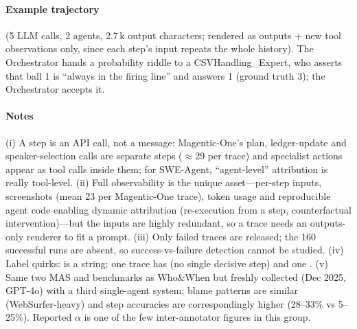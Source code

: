 \paragraph{Example trajectory}  (5 LLM calls, 2 agents, 2.7\,k output characters; rendered as outputs + new tool observations only, since each step's input repeats the whole history). The Orchestrator hands a probability riddle to a CSVHandling\_Expert, who asserts that ball 1 is ``always in the firing line'' and answers 1 (ground truth 3); the Orchestrator accepts it.


\paragraph{Notes} (i) A step is an API call, not a message: Magentic-One's plan, ledger-update and speaker-selection calls are separate steps ($\approx$29 per trace) and specialist actions appear as tool calls inside them; for SWE-Agent, ``agent-level'' attribution is really tool-level. (ii) Full observability is the unique asset---per-step inputs, screenshots (mean 23 per Magentic-One trace), token usage and reproducible agent code enabling dynamic attribution (re-execution from a step, counterfactual intervention)---but the inputs are highly redundant, so a trace needs an outputs-only renderer to fit a prompt. (iii) Only failed traces are released; the 160 successful runs are absent, so success-vs-failure detection cannot be studied. (iv) Label quirks:  is a string; one trace has  (no single decisive step) and one . (v) Same two MAS and benchmarks as Who\&When but freshly collected (Dec 2025, GPT-4o) with a third single-agent system; blame patterns are similar (WebSurfer-heavy) and step accuracies are correspondingly higher (28--33\% vs 5--25\%). Reported $\alpha$ is one of the few inter-annotator figures in this group.
